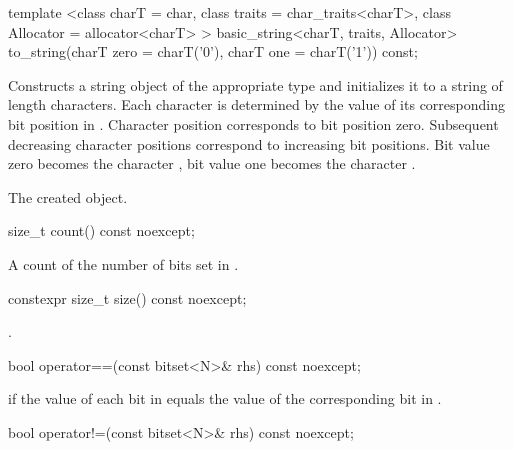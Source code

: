 %
\begin{itemdecl}
template <class charT = char,
    class traits = char_traits<charT>,
    class Allocator = allocator<charT> >
  basic_string<charT, traits, Allocator>
  to_string(charT zero = charT('0'), charT one = charT('1')) const;
\end{itemdecl}

\begin{itemdescr}
\pnum
\effects
Constructs a string object of the appropriate type
and initializes it to a string of length  characters.
Each character is determined by the value of its corresponding bit position in
.
Character position  corresponds to bit position zero.
Subsequent decreasing character positions correspond to increasing bit
positions.
Bit value zero becomes the character ,
bit value one becomes the character
.

\pnum
\returns
The created object.
\end{itemdescr}

%
\begin{itemdecl}
size_t count() const noexcept;
\end{itemdecl}

\begin{itemdescr}
\pnum
\returns
A count of the number of bits set in
.
\end{itemdescr}

%
\begin{itemdecl}
constexpr size_t size() const noexcept;
\end{itemdecl}

\begin{itemdescr}
\pnum
\returns
{}.
\end{itemdescr}

%
\begin{itemdecl}
bool operator==(const bitset<N>& rhs) const noexcept;
\end{itemdecl}

\begin{itemdescr}
\pnum
\returns
{} if the value of each bit in
equals the value of the corresponding bit in .
\end{itemdescr}

%
\begin{itemdecl}
bool operator!=(const bitset<N>& rhs) const noexcept;
\end{itemdecl}

